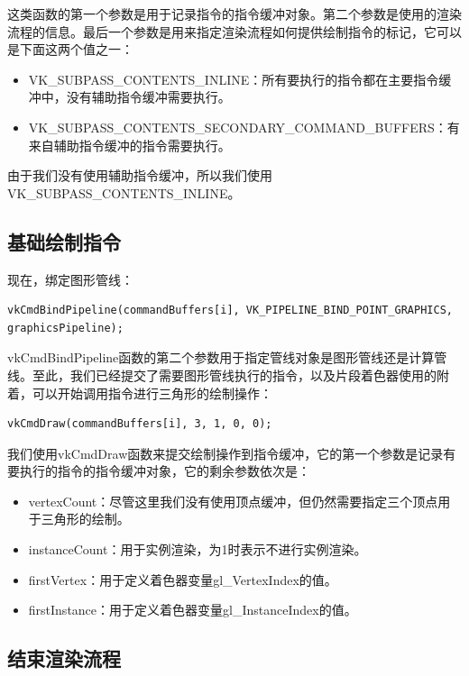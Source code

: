 \documentclass{ctexart}
\begin{document}
这类函数的第一个参数是用于记录指令的指令缓冲对象。第二个参数是使用的渲染流程的信息。最后一个参数是用来指定渲染流程如何提供绘制指令的标记，它可以是下面这两个值之一：

\begin{itemize}
	\item VK\_SUBPASS\_CONTENTS\_INLINE：所有要执行的指令都在主要指令缓冲中，没有辅助指令缓冲需要执行。
	\item VK\_SUBPASS\_CONTENTS\_SECONDARY\_COMMAND\_BUFFERS：有来自辅助指令缓冲的指令需要执行。
\end{itemize}

由于我们没有使用辅助指令缓冲，所以我们使用VK\_SUBPASS\_CONTENTS\_INLINE。

\subsection{基础绘制指令}

现在，绑定图形管线：

\begin{lstlisting}[language={[ANSI]C}]
vkCmdBindPipeline(commandBuffers[i], VK_PIPELINE_BIND_POINT_GRAPHICS, graphicsPipeline);
\end{lstlisting}

vkCmdBindPipeline函数的第二个参数用于指定管线对象是图形管线还是计算管线。至此，我们已经提交了需要图形管线执行的指令，以及片段着色器使用的附着，可以开始调用指令进行三角形的绘制操作：

\begin{lstlisting}[language={[ANSI]C}]
vkCmdDraw(commandBuffers[i], 3, 1, 0, 0);
\end{lstlisting}

我们使用vkCmdDraw函数来提交绘制操作到指令缓冲，它的第一个参数是记录有要执行的指令的指令缓冲对象，它的剩余参数依次是：

\begin{itemize}
	\item vertexCount：尽管这里我们没有使用顶点缓冲，但仍然需要指定三个顶点用于三角形的绘制。
	\item instanceCount：用于实例渲染，为1时表示不进行实例渲染。
	\item firstVertex：用于定义着色器变量gl\_VertexIndex的值。
	\item firstInstance：用于定义着色器变量gl\_InstanceIndex的值。
\end{itemize}

\subsection{结束渲染流程}
\end{document}

